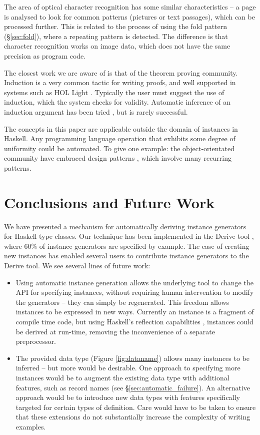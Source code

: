 \documentclass{llncs}
\begin{document}
The area of optical character recognition \cite{ocr} has some similar characteristics -- a page is analysed to look for common patterns (pictures or text passages), which can be processed further. This is related to the process of using the fold pattern (\S\ref{sec:fold}), where a repeating pattern is detected. The difference is that character recognition works on image data, which does not have the same precision as program code.

The closest work we are aware of is that of the theorem proving community. Induction is a very common tactic for writing proofs, and well supported in systems such as HOL Light \cite{hol_light}. Typically the user must suggest the use of induction, which the system checks for validity. Automatic inference of an induction argument has been tried \cite{mintchev:reasoning}, but is rarely successful.

The concepts in this paper are applicable outside the domain of instances in Haskell. Any programming language operation that exhibits some degree of uniformity could be automated. To give one example: the object-orientated community have embraced design patterns \cite{design_patterns}, which involve many recurring patterns.

\section{Conclusions and Future Work}
\label{sec:conclusion}

We have presented a mechanism for automatically deriving instance generators for Haskell type classes. Our technique has been implemented in the Derive tool \cite{derive}, where 60\% of instance generators are specified by example. The ease of creating new instances has enabled several users to contribute instance generators to the Derive tool. We see several lines of future work:

\begin{itemize}
\item Using automatic instance generation allows the underlying tool to change the API for specifying instances, without requiring human intervention to modify the generators -- they can simply be regenerated. This freedom allows instances to be expressed in new ways. Currently an instance is a fragment of compile time code, but using Haskell's reflection capabilities \cite{lammel:syb2}, instances could be derived at run-time, removing the inconvenience of a separate preprocessor.
\item The provided data type (Figure \ref{fig:dataname}) allows many instances to be inferred -- but more would be desirable. One approach to specifying more instances would be to augment the existing data type with additional features, such as record names (see \S\ref{sec:automatic_failure}). An alternative approach would be to introduce new data types with features specifically targeted for certain types of definition. Care would have to be taken to ensure that these extensions do not substantially increase the complexity of writing examples.
\end{itemize}
\end{document}
